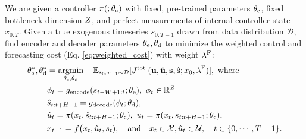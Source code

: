 \begin{problem}
\label{prob:codesign}
We are given a controller $\pi(; \theta_{\mathrm{c}})$ with fixed, pre-trained parameters $\theta_{\mathrm{c}}$, fixed bottleneck dimension $Z$, and perfect measurements of internal controller state $x_{0:T}$. Given a true exogenous timeseries $s_{0:T-1}$ drawn from data distribution $\mathcal{D}$, find encoder and decoder parameters $\theta_{\mathrm{e}}, \theta_{\mathrm{d}}$ to minimize the weighted control and forecasting cost (Eq. \ref{eq:weighted_cost}) with weight $\lambda^{\mathrm{F}}$:
\begin{align*}
    \theta_{\mathrm{e}}^{*}, \theta_{\mathrm{d}}^{*} & = \mathop{\rm argmin}_{\theta_{\mathrm{e}}, \theta_{\mathrm{d}}} \quad \mathbb{E}_{s_{0:T-1} \sim \mathcal{D}} [J^{\mathrm{tot.}}(\bold{u}, \bold{\hat{u}}, \bold{s}, \bold{\hat{s}}; x_0, \lambda^{\mathrm{F}})], ~\mathrm{where~} \\ 
    & \phi_t = g_{\mathrm{encode}}(s_{t-W+1:t}; \theta_{\mathrm{e}}), ~\phi_t \in \mathbb{R}^{Z} \\
    & \hat{s}_{t:t+H-1} = g_{\mathrm{decode}}(\phi_t; \theta_{\mathrm{d}}), \\
    & \hat{u}_t = \pi(x_t, \hat{s}_{t:t+H-1}; \theta_{\mathrm{c}}), ~u_t = \pi(x_t, s_{t:t+H-1}; \theta_{\mathrm{c}}), \\ 
    & x_{t+1} = f\big(x_t, \hat{u}_t, s_t), \quad \mathrm{and} \quad x_t \in \mathcal{X}, \hat{u}_t \in \mathcal{U}, \quad t \in \{0, \cdots, T-1\}.
\end{align*}
\end{problem}


